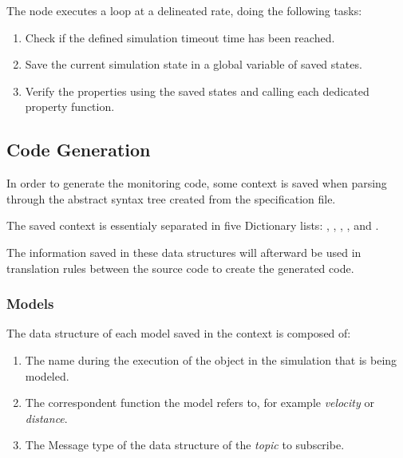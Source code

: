The node executes a loop at a delineated rate, doing the following tasks:

\begin{enumerate}
    \item Check if the defined simulation timeout time has been reached.
    \item Save the current simulation state in a global variable of saved states.
    \item Verify the properties using the saved states and calling each dedicated property function.
\end{enumerate}


\subsection{Code Generation}
\label{ssec:compileCtx}

In order to generate the monitoring code, some context is saved when parsing through the abstract syntax tree created from the specification file.

The saved context is essentialy separated in five Dictionary lists: , , , , and .

The information saved in these data structures will afterward be used in translation rules between the source code to create the generated code.


\subsubsection{Models}
\label{sssec:compileModels}

The data structure of each model saved in the context is composed of:

\begin{enumerate}
    \item The name during the execution of the object in the simulation that is being modeled.
    \item The correspondent function the model refers to, for example \textit{velocity} or \textit{distance}.
    \item The Message type of the data structure of the \textit{topic} to subscribe.
\end{enumerate}

